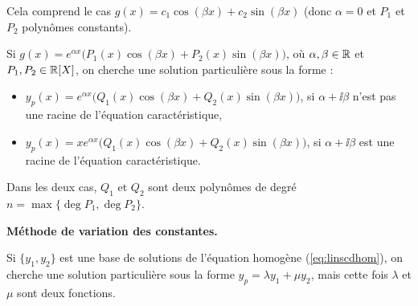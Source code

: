 \documentclass[10pt,class=article,crop=false]{standalone}
\begin{document}
\begin{multicols}{2}
Cela comprend le cas $g(x) = c_1\cos(\beta x) + c_2 \sin(\beta x)$ (donc $\alpha=0$ et $P_1$ et $P_2$ polynômes constants).

Si $g(x)=e^{\alpha x} \big(P_1(x)\cos (\beta x)+P_2(x)\sin (\beta x)\big)$,
où $\alpha ,\beta \in \mathbb{R}$ et $P_1,P_2\in\mathbb{R}[X]$, on cherche une solution particulière sous la forme :
\begin{itemize}
	\item $y_p(x)=e^{\alpha x} \big( Q_1(x)\cos (\beta x)+Q_2(x)\sin (\beta x) \big)$,
	si $\alpha +\ii \beta$ n'est pas une racine de l'équation caractéristique,
	
	\item $y_p(x)=xe^{\alpha x}  \big( Q_1(x)\cos (\beta x)+Q_2(x)\sin (\beta x) \big)$,
	si $\alpha +\ii \beta$ est une racine de l'équation caractéristique.
\end{itemize}
Dans les deux cas, $Q_1$ et $Q_2$ sont deux polynômes
de degré $n=\max\{\deg P_1,\deg P_2\}$.


\textbf{Méthode de variation des constantes.}

Si $\{y_1,y_2\}$ est une base de solutions de l'équation homogène (\ref{eq:linscdhom}),
on cherche une solution particulière sous la forme
$y_p = \lambda y_1 + \mu y_2$, mais cette fois $\lambda$ et $\mu$ sont deux fonctions.



\end{multicols}
\end{document}
